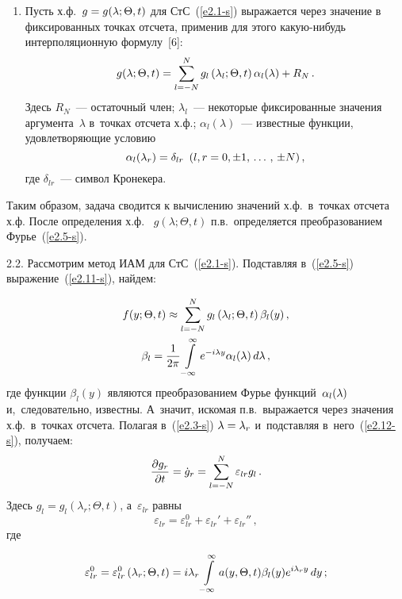 \begin{multicols}{2}
\begin{enumerate}[1.]
\item Пусть х.ф.\ $g\hm=g(\lambda;\Theta, t)$ для СтС~(\ref{e2.1-s}) 
выражается через значение в фиксированных точках отсчета, применив для этого 
ка\-кую-ни\-будь интерполяционную формулу~[6]:
\begin{equation}
    g(\lambda; \Theta, t) = \sum\limits_{l=-N}^N g_l \left(\lambda_l;\Theta, t\right) 
    \alpha_l (\lambda)+ R_N\,.\label{e2.11-s}
    \end{equation}
Здесь $R_N$~--- остаточный член;  $\lambda_l$~--- 
некоторые фиксированные значения аргумента~$\lambda$ в~точках отсчета х.ф.; 
$\alpha_l(\lambda)$~--- известные функции, удовлетворяющие условию
    $$
    \alpha_l (\lambda_r) =\delta_{lr}\enskip (l,r=0, \pm 1,\,\ldots\,,\, \pm N)\,,
    $$
где $\delta_{lr}$~--- символ Кронекера.

\end{enumerate}

Таким образом, задача сводится к вычислению значений х.ф.\  
в~точках отсчета х.ф. После определения х.ф.~ $g(\lambda;\Theta,t)$ п.в.\
определяется преобразованием Фурье~(\ref{e2.5-s}).

2.2. Рассмотрим метод ИАМ для СтС~(\ref{e2.1-s}).
Подставляя в~(\ref{e2.5-s}) выражение~(\ref{e2.11-s}), найдем:

\noindent
\begin{multline}
f(y;\Theta, t) \approx \sum\limits_{l=-N}^N g_l \left(\lambda_l ; \Theta, t\right) 
    \beta_l (y)\,,
    \\
\beta_l = \displaystyle\frac{\displaystyle 1\mathstrut}{\displaystyle 2\pi\mathstrut} \int\limits_{-\infty}^\infty e^{-i\lambda y} \alpha_l (\lambda)\, d\lambda\,,
\label{e2.12-s}
\end{multline}
где функции $\beta_l(y)$ являются преобразованием \mbox{Фурье} функций~$\alpha_l(\lambda)$ 
и,~следовательно, известны.
А~значит, искомая п.в.\ выражается через значения х.ф.\ в~точках отсчета. 
Полагая в~(\ref{e2.3-s}) $\la\hm=\la_r$ и~под\-став\-ляя в~него~(\ref{e2.12-s}), получаем:
    \begin{equation}
\displaystyle\frac{\displaystyle \partial g_r\mathstrut}{\displaystyle \partial t\mathstrut} = \dot g_r = \sum\limits_{l=-N}^N \varepsilon_{lr} g_l\,.
\label{e2.14-s}
\end{equation}
Здесь $g_l = g_l (\lambda_r;\Theta, t)$, а~$\varepsilon_{lr}$ равны
\begin{equation}
\varepsilon_{lr}=\varepsilon_{lr}^0 +\varepsilon_{lr}'+\varepsilon_{lr}''\,,
\label{e2.15-s}
\end{equation}
где

\noindent
   $$
   \varepsilon_{lr}^0 = \varepsilon_{lr}^0\left(\lambda_r;\Theta, t\right)= 
   i \lambda_r \int\limits_{-\infty}^\infty a(y, \Theta, t) \beta_l (y) e^{i\lambda_r y}\, dy\,;
   $$
   

\end{multicols}
